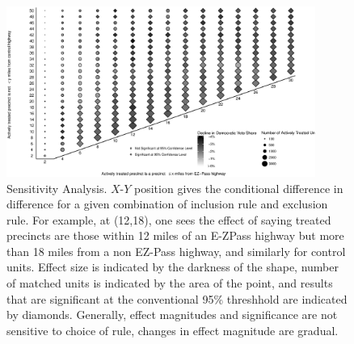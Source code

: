 
\begin{figure}[t]
    \centering
    \includegraphics[width=0.9\textwidth]{Figures/new_style_04.eps}
    \caption{Sensitivity Analysis. $X$-$Y$ position gives the conditional difference in difference for a given combination of inclusion rule and exclusion rule. For example, at (12,18), one sees the effect of saying treated precincts are those within 12 miles of an E-ZPass highway but more than 18 miles from a non EZ-Pass highway, and similarly for control units. Effect size is indicated by the darkness of the shape, number of matched units is indicated by the area of the point, and results that are significant at the conventional 95\% threshhold are indicated by diamonds. Generally, effect magnitudes and significance are not sensitive to choice of rule, changes in effect magnitude are gradual.}
    \label{fig:heatmap}
\end{figure}